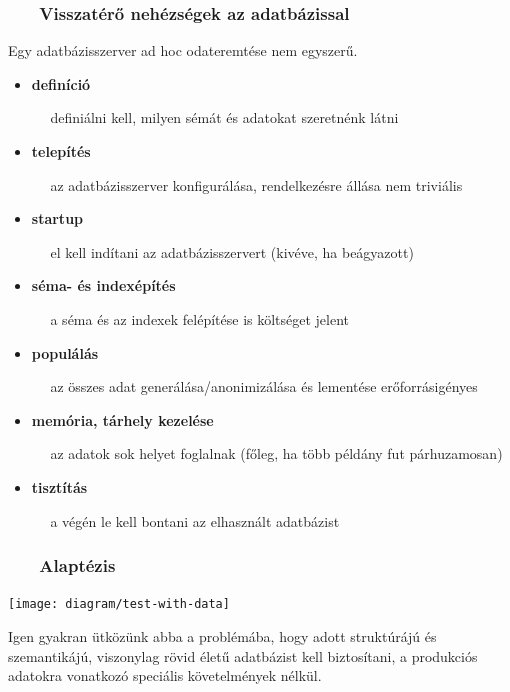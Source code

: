 \documentclass[
]{beamer}
\newcommand{\slidetitle}[2]{\frametitle{{\small #1 ~ \ding{226} ~ } \normalsize \textbf{#2} }}
\begin{document}
\begin{frame}
    \slidetitle{\sectionshorttitle}{Visszatérő nehézségek az adatbázissal}

    
    Egy adatbázisszerver ad hoc odateremtése nem egyszerű. \par
    
    \vspace{0.5em}

    \begin{itemize}
        \item \textbf{definíció} \par
            { \small ~~ definiálni kell, milyen sémát és adatokat szeretnénk látni }
        \item \textbf{telepítés} \par
            { \small ~~ az adatbázisszerver konfigurálása, rendelkezésre állása nem triviális }
        \item \textbf{startup} \par
            { \small ~~ el kell indítani az adatbázisszervert (kivéve, ha beágyazott) }
        \item \textbf{séma- és indexépítés} \par
            { \small ~~ a séma és az indexek felépítése is költséget jelent }
        \item \textbf{populálás} \par
            { \small ~~ az összes adat generálása/anonimizálása és lementése erőforrásigényes }
        \item \textbf{memória, tárhely kezelése} \par
            { \small ~~ az adatok sok helyet foglalnak (főleg, ha több példány fut párhuzamosan) }
        \item \textbf{tisztítás} \par
            { \small ~~ a végén le kell bontani az elhasznált adatbázist }
    \end{itemize}
\end{frame}

\begin{frame}
    \slidetitle{\sectionshorttitle}{Alaptézis}
    
    \centering
    
    \texttt{[image: diagram/test-with-data]}
    
    \vspace{1cm}
    
    \begin{minipage}[b]{0.8\textwidth}
        \justifying
        Igen gyakran ütközünk abba a problémába,
        hogy adott struktúrájú és szemantikájú,
        viszonylag rövid életű adatbázist kell biztosítani,
        a produkciós adatokra vonatkozó speciális követelmények nélkül.
    \end{minipage}
\end{frame}
\end{document}
